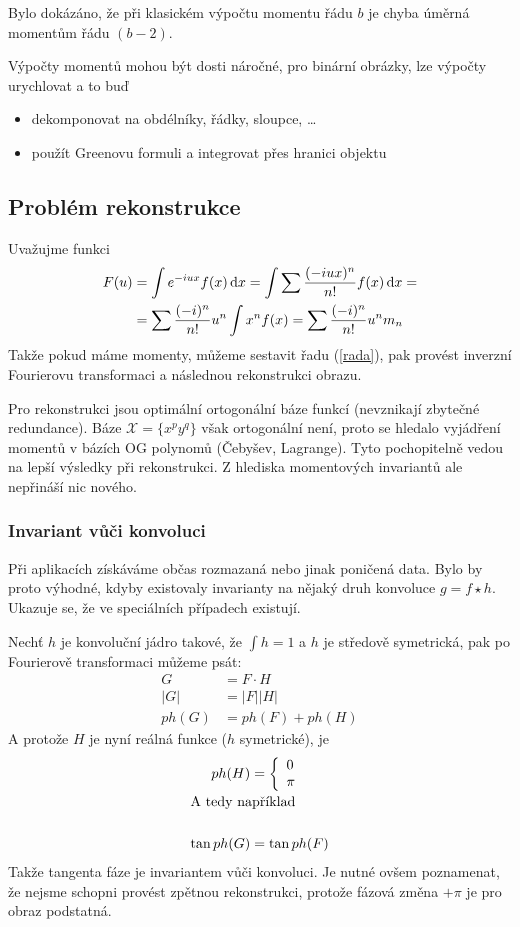 Bylo dokázáno, že při klasickém výpočtu momentu řádu $b$ je chyba úměrná momentům řádu $(b-2)$. 

Výpočty momentů mohou být dosti náročné, pro binární obrázky, lze výpočty urychlovat a to buď
\begin{itemize}
	\item dekomponovat na obdélníky, řádky, sloupce, \dots
	\item použít Greenovu formuli a integrovat přes hranici objektu
\end{itemize}

\subsection{Problém rekonstrukce}

Uvažujme funkci
\begin{align}
F(u) &= \int e^{-iux}f(x)\dif x=\int\sum\frac{(-iux)^n}{n!}f(x)\dif x=\nonumber\\
 &= \sum\frac{(-i)^n}{n!}u^n\int x^nf(x)=\sum\frac{(-i)^n}{n!}u^n m_n\label{rada}
\end{align}
\noindent Takže pokud máme momenty, můžeme sestavit řadu (\ref{rada}), pak provést inverzní Fourierovu 
transformaci a následnou rekonstrukci obrazu.

Pro rekonstrukci jsou optimální ortogonální báze funkcí (nevznikají zbytečné redundance).
Báze $\mathcal{X}=\{x^py^q\}$ však ortogonální není, proto se hledalo vyjádření momentů
v bázích OG polynomů (Čebyšev, Lagrange). Tyto pochopitelně vedou na lepší výsledky při rekonstrukci.
Z hlediska momentových invariantů ale nepřináší nic nového.

\subsubsection{Invariant vůči konvoluci}
Při aplikacích získáváme občas rozmazaná nebo jinak poničená data. Bylo by proto výhodné, kdyby
existovaly invarianty na nějaký druh konvoluce $g=f\star h$. Ukazuje se, že ve speciálních případech
existují. 

Nechť $h$ je konvoluční jádro takové, že $\int h=1$ a $h$ je středově symetrická, pak po Fourierově transformaci můžeme psát:
\begin{align}
G &= F\cdot H\\
|G| &= |F||H|\\
ph(G) &= ph(F)+ph(H)
\end{align}	
A protože $H$ je nyní reálná funkce ($h$ symetrické), je
\begin{align}
ph(H) &= \left\{\begin{array}{ll}0\\\pi\end{array}\right.\\
\noalign{\hbox{A tedy například}\nonumber}\\
\tan ph(G) &= \tan ph(F)
\end{align}
\noindent Takže tangenta fáze je invariantem vůči konvoluci. Je nutné ovšem poznamenat, že 
nejsme schopni provést zpětnou rekonstrukci, protože fázová změna $+\pi$ je pro obraz podstatná.

